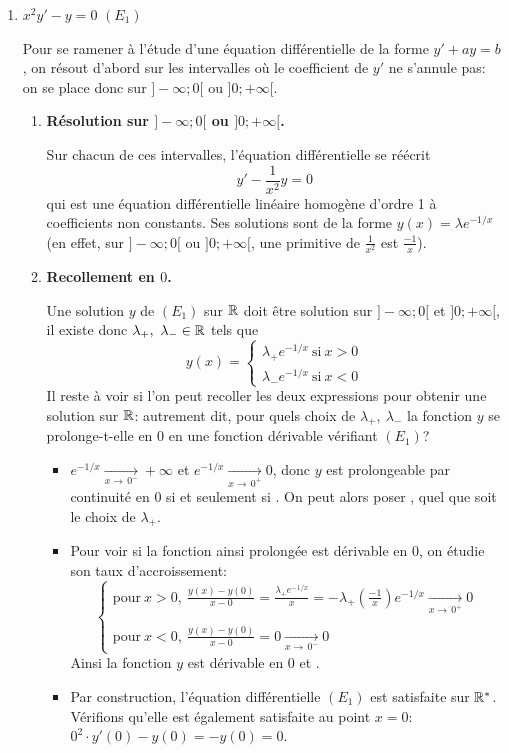 \documentclass[11pt,a4paper]{article}
\begin{document}
\begin{enumerate}
\item $x^2y'-y = 0$ $(E_1)$


Pour se ramener à l'étude d'une équation différentielle de la forme $y'+ay=b$, 
on résout d'abord sur les intervalles où le coefficient de $y'$ ne s'annule pas: 
on se place donc sur $]-\infty;0[$ ou $]0;+\infty[$.

\begin{enumerate}
 \item \textbf{Résolution sur $]-\infty;0[$ ou $]0;+\infty[$.}
 
Sur chacun de ces intervalles, l'équation différentielle se réécrit 
$$y'-\frac{1}{x^2}y=0$$ 
qui est une équation différentielle linéaire homogène d'ordre 1 à coefficients non constants. Ses solutions sont de la forme $y(x)=\lambda e^{-1/x}$ (en effet, sur $]-\infty;0[$ ou $]0;+\infty[$, une primitive de $\frac{1}{x^2}$ est $\frac{-1}{x}$).

  \item \textbf{Recollement en $0$.}
  
Une solution $y$ de $(E_1)$ sur $\mathbb{R}$ doit \^etre solution sur $]-\infty;0[$ et $]0;+\infty[$, il existe donc $\lambda_+,\ \lambda_-\in\R$ tels que 
$$y(x)=\left\lbrace\begin{array}{l}
\lambda_+e^{-1/x}\ \mathrm{si}\ x>0\\
\lambda_-e^{-1/x}\ \mathrm{si}\ x<0
\end{array}\right.$$
Il reste à voir si l'on peut recoller les deux expressions pour obtenir une solution sur $\mathbb{R}$: autrement dit, pour quels choix de $\lambda_+,\ \lambda_-$ la fonction $y$ se prolonge-t-elle en 0 en une fonction dérivable vérifiant $(E_1)$? 
\begin{itemize}
\item $e^{-1/x}\xrightarrow[x\to\,0^-]{}+\infty$ et $e^{-1/x}\xrightarrow[x\to\,0^+]{}0$, donc $y$ est prolongeable par continuité en 0 si et seulement si . On peut alors poser , quel que soit le choix de $\lambda_+$.
\item Pour voir si la fonction ainsi prolongée est dérivable en 0, on étudie son taux d'accroissement:
$$\left\{\begin{array}{l}
\text{pour}\ x>0,\ \frac{y(x)-y(0)}{x-0}=\frac{\lambda_+e^{-1/x}}{x}=-\lambda_+(\frac{-1}{x})e^{-1/x}\xrightarrow[x\to\,0^+]{}0\\
\ \\
\text{pour}\ x<0,\ \frac{y(x)-y(0)}{x-0}=0\xrightarrow[x\to\,0^-]{}0
\end{array}\right.$$
Ainsi la fonction $y$ est dérivable en 0 et .
\item Par construction, l'équation différentielle $(E_1)$ est satisfaite sur $\mathbb{R}^*$. 
Vérifions qu'elle est également satisfaite au point $x=0$: $0^2 \cdot y'(0)-y(0)=-y(0)=0$.
\end{itemize}


\end{enumerate}
\end{enumerate}
\end{document}
